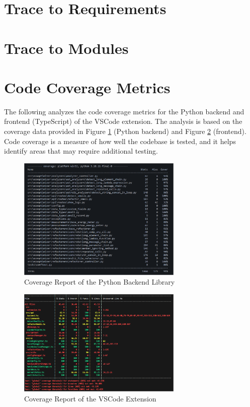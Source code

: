 \documentclass[12pt, titlepage]{article}
\begin{document}
\section{Trace to Requirements}

\section{Trace to Modules}

\section{Code Coverage Metrics}

The following analyzes the code coverage metrics for the Python
backend and frontend (TypeScript) of the VSCode extension. The
analysis is based on the coverage data provided in Figure
\ref{img:python-cov} (Python backend) and Figure \ref{img:vscode-cov}
(frontend). Code coverage is a measure of how well the codebase is
tested, and it helps identify areas that may require additional testing.

\begin{figure}[H]
  \centering
  \includegraphics[width=0.7\textwidth]{../Images/python-coverage.png}
  \caption{Coverage Report of the Python Backend Library}
  \label{img:python-cov}
\end{figure}

\begin{figure}[H]
  \centering
  \includegraphics[width=0.7\textwidth]{../Images/vscode-coverage.png}
  \caption{Coverage Report of the VSCode Extension}
  \label{img:vscode-cov}
\end{figure}
\end{document}
